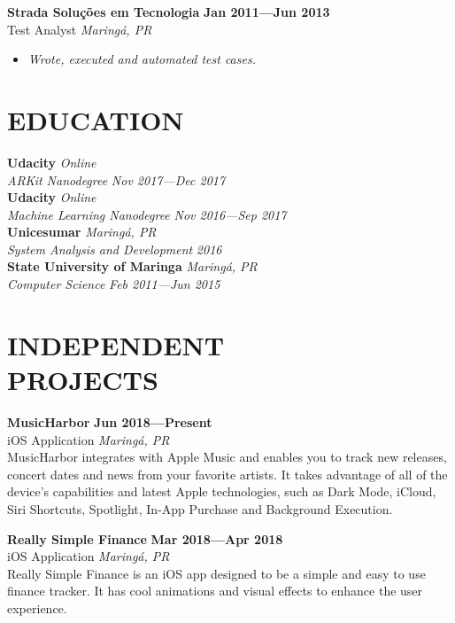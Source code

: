 \documentclass[line,margin]{res}
\begin{document}
\begin{resume}
  {\bf Strada Solu\c{c}\~oes em Tecnologia} \hfill {\bf Jan 2011---Jun 2013} \\
  Test Analyst \hfill {\sl Maring\'a, PR}\\[-6pt]
    \begin{itemize}
    \item {\sl Wrote, executed and automated test cases.}
  \end{itemize}


\section{EDUCATION}
  {\bf Udacity} \hfill {\sl Online} \\
  {\sl ARKit Nanodegree} \hfill {\sl Nov 2017---Dec 2017}\\[6pt]
  {\bf Udacity} \hfill {\sl Online} \\
  {\sl Machine Learning Nanodegree} \hfill {\sl Nov 2016---Sep 2017}\\[6pt]
  {\bf Unicesumar} \hfill {\sl Maring\'a, PR} \\
  {\sl System Analysis and Development} \hfill {\sl 2016}\\[6pt]
  {\bf State University of Maringa} \hfill {\sl Maring\'a, PR} \\
  {\sl Computer Science} \hfill {\sl Feb 2011---Jun 2015}


\section{INDEPENDENT \\ PROJECTS}
  {\bf MusicHarbor} \hfill {\bf Jun 2018---Present} \\
  iOS Application \hfill {\sl Maring\'a, PR}\\[6pt]
  MusicHarbor integrates with Apple Music and enables you to track new releases, concert dates and news from your favorite artists. It takes advantage of all of the device's capabilities and latest Apple technologies, such as Dark Mode, iCloud, Siri Shortcuts, Spotlight, In-App Purchase and Background Execution.
  
  {\bf Really Simple Finance} \hfill {\bf Mar 2018---Apr 2018} \\
  iOS Application \hfill {\sl Maring\'a, PR}\\[6pt]
  Really Simple Finance is an iOS app designed to be a simple and easy to use finance tracker.
  It has cool animations and visual effects to enhance the user experience.


\end{resume}
\end{document}
